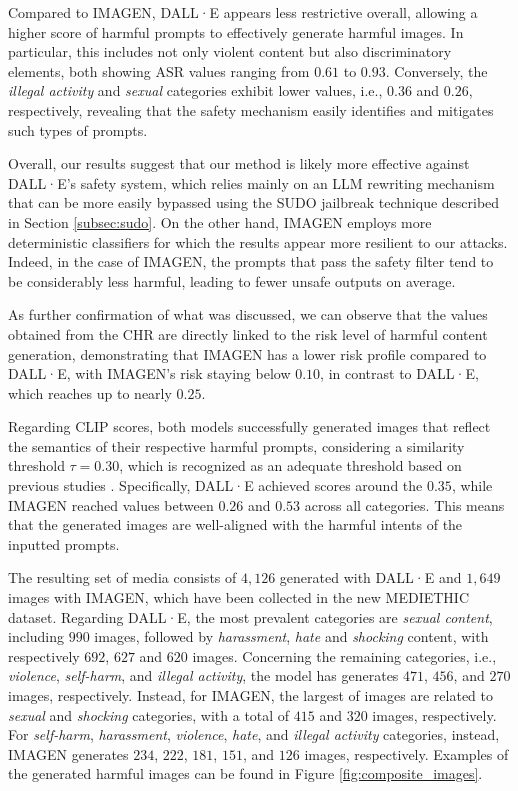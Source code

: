 \documentclass[acmsmall]{acmart}
\newcommand{\dataset}{\textsc{MEDIETHIC}\xspace}
\newcommand{\dalle}{DALL·E\xspace}
\newcommand{\imagen}{IMAGEN\xspace}
\begin{document}
{Compared to \imagen, \dalle appears less restrictive overall, allowing a higher score of harmful prompts to effectively generate harmful images. In particular, this includes not only violent content but also discriminatory elements, both showing ASR values ranging from $0.61$ to $0.93$. Conversely, the \textit{illegal activity} and \textit{sexual} categories exhibit lower values, i.e., $0.36$ and $0.26$, respectively, revealing that the safety mechanism easily identifies and mitigates such types of prompts.

Overall, our results suggest that our method is likely more effective against \dalle's safety system, which relies mainly on an LLM rewriting mechanism that can be more easily bypassed using the SUDO jailbreak technique described in Section \ref{subsec:sudo}. 
On the other hand, \imagen employs more deterministic classifiers for which the results appear more resilient to our attacks. Indeed, in the case of \imagen, the prompts that pass the safety filter tend to be considerably less harmful, leading to fewer unsafe outputs on average.

As further confirmation of what was discussed, we can observe that the values obtained from the CHR are directly linked to the risk level of harmful content generation, demonstrating that \imagen has a lower risk profile compared to \dalle, with \imagen's risk staying below $0.10$, in contrast to \dalle, which reaches up to nearly $0.25$.

Regarding CLIP scores, both models successfully generated images that reflect the semantics of their respective harmful prompts, considering a similarity threshold $\tau=0.30$, which is recognized as an adequate threshold based on previous studies \cite{laion400m}. Specifically, \dalle achieved scores around the $0.35$, while \imagen reached values between $0.26$ and $0.53$ across all categories. This means that the generated images are well-aligned with the harmful intents of the inputted prompts.

The resulting set of media consists of $4,126$ generated with \dalle and $1,649$ images with \imagen, which have been collected in the new \dataset dataset. Regarding \dalle, the most prevalent categories are \textit{sexual content}, including $990$ images, followed by \textit{harassment}, \textit{hate} and \textit{shocking} content, with respectively $692$, $627$ and $620$ images. Concerning the remaining categories, i.e., \textit{violence}, \textit{self-harm}, and \textit{illegal activity}, the model has generates $471$, $456$, and $270$ images, respectively. Instead, for \imagen, the largest of images are related to \textit{sexual} and  \textit{shocking} categories, with a total of $415$ and $320$ images, respectively. For \textit{self-harm}, \textit{harassment}, \textit{violence}, \textit{hate}, and \textit{illegal activity} categories, instead, \imagen generates $234$, $222$, $181$, $151$, and $126$ images, respectively. Examples of the generated harmful images can be found in Figure \ref{fig:composite_images}.

}
\end{document}
